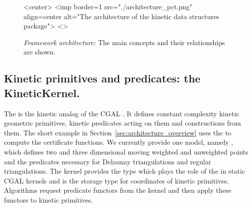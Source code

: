 \begin{figure}[htb]
\begin{ccHtmlOnly}
<center>
<imp border=1 src="./architecture_pct.png" align=center alt="The architecture of the kinetic data structures package">
<\center>
\end{ccHtmlOnly}
\caption{ \label{fig:architecture} 
{\em Framework architecture:} The main concepts and their relationships are shown. }
\end{figure}



\subsection{Kinetic primitives and predicates: the KineticKernel.}
\label{sec:kinetic_kernel}

The  is the kinetic analog of the CGAL
. It defines constant complexity kinetic geometric
primitives, kinetic predicates acting on them and constructions from
them. The short example in Section~\ref{sec:architecture_overview}
uses the  to compute the 
certificate functions. We currently provide one model, namely
, which
defines two and three dimensional moving weighted and unweighted
points and the predicates necessary for Delaunay triangulations and
regular triangulations. The kernel provides the type 
which plays the role of the  in static
CGAL kernels and is the storage type for coordinates of kinetic
primitives. Algorithms request predicate functors from the kernel and
then apply these functors to kinetic primitives.

